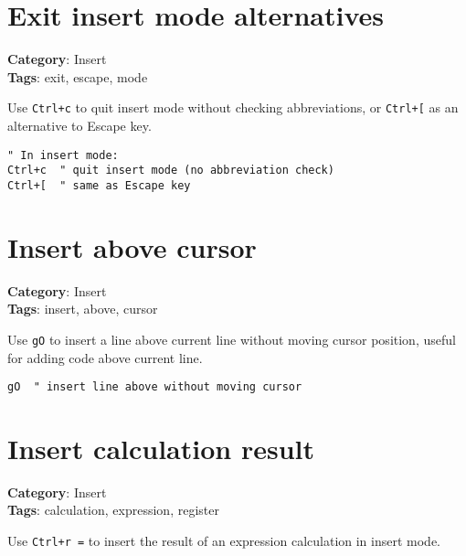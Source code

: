{{{{{{\section{Exit insert mode alternatives}

\textbf{Category}: Insert\\ \textbf{Tags}: exit, escape, mode
\vspace{0.5cm}

Use {\footnotesize \Verb§Ctrl+c§} to quit insert mode without checking abbreviations, or {\footnotesize \Verb§Ctrl+[§} as an alternative to Escape key.

\begin{Exa*}{}
\begin{Verbatim}[fontsize=\footnotesize, breaklines, breakanywhere]
" In insert mode:
Ctrl+c  " quit insert mode (no abbreviation check)
Ctrl+[  " same as Escape key
\end{Verbatim}
\end{Exa*}

\section{Insert above cursor}

\textbf{Category}: Insert\\ \textbf{Tags}: insert, above, cursor
\vspace{0.5cm}

Use {\footnotesize \Verb§gO§} to insert a line above current line without moving cursor position, useful for adding code above current line.

\begin{Exa*}{}
\begin{Verbatim}[fontsize=\footnotesize, breaklines, breakanywhere]
gO  " insert line above without moving cursor
\end{Verbatim}
\end{Exa*}

\section{Insert calculation result}

\textbf{Category}: Insert\\ \textbf{Tags}: calculation, expression, register
\vspace{0.5cm}

Use {\footnotesize \Verb§Ctrl+r =§} to insert the result of an expression calculation in insert mode.

}}}}}}
